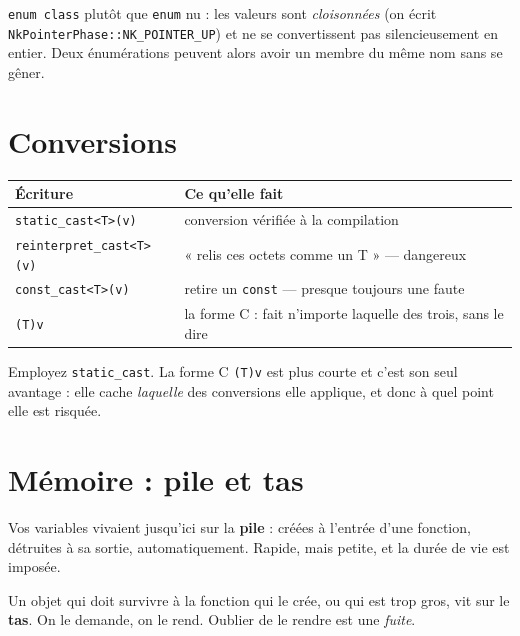 \begin{nkretenir}
\texttt{enum class} plutôt que \texttt{enum} nu : les valeurs sont
\emph{cloisonnées} (on écrit \texttt{NkPointerPhase::NK\_POINTER\_UP}) et ne se
convertissent pas silencieusement en entier. Deux énumérations peuvent alors
avoir un membre du même nom sans se gêner.
\end{nkretenir}

\section{Conversions}

\begin{center}
\begin{tabular}{@{}ll@{}}
\toprule
\textbf{Écriture} & \textbf{Ce qu'elle fait} \\
\midrule
\texttt{static\_cast<T>(v)}      & conversion vérifiée à la compilation \\
\texttt{reinterpret\_cast<T>(v)} & « relis ces octets comme un T » --- dangereux \\
\texttt{const\_cast<T>(v)}       & retire un \texttt{const} --- presque toujours une faute \\
\texttt{(T)v} & la forme C : fait n'importe laquelle des trois, sans le dire \\
\bottomrule
\end{tabular}
\end{center}

\begin{nkretenir}
Employez \texttt{static\_cast}. La forme C \texttt{(T)v} est plus courte et c'est
son seul avantage : elle cache \emph{laquelle} des conversions elle applique, et
donc à quel point elle est risquée.
\end{nkretenir}

\section{Mémoire : pile et tas}

Vos variables vivaient jusqu'ici sur la \textbf{pile} : créées à l'entrée d'une
fonction, détruites à sa sortie, automatiquement. Rapide, mais petite, et la
durée de vie est imposée.

Un objet qui doit survivre à la fonction qui le crée, ou qui est trop gros, vit
sur le \textbf{tas}. On le demande, on le rend. Oublier de le rendre est une
\emph{fuite}.

